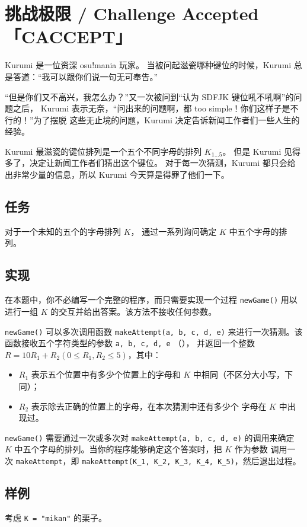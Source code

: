 \documentclass[UTF8, 11pt, a4paper]{article}
\begin{document}
\section*{挑战极限 / Challenge Accepted \makebox[2.5em]{} \small{「CACCEPT」}}

Kurumi 是一位资深 osu!mania 玩家。%
当被问起滋瓷哪种键位的时候，Kurumi 总是答道：“我可以跟你们说一句无可奉告。”%

“但是你们又不高兴，我怎么办？”又一次被问到“认为 SDFJK 键位吼不吼啊”的问题之后，%
Kurumi 表示无奈，“问出来的问题啊，都 too simple！你们这样子是不行的！”为了摆脱%
这些无止境的问题，Kurumi 决定告诉新闻工作者们一些人生的经验。

Kurumi 最滋瓷的键位排列是一个五个不同字母的排列 $K_{1 \dots 5}$。%
但是 Kurumi 见得多了，决定让新闻工作者们猜出这个键位。%
对于每一次猜测，Kurumi 都只会给出非常少量的信息，所以 Kurumi 今天算是得罪了他们一下。

\subsection*{任务}
对于一个未知的五个的字母排列 $K$，%
通过一系列询问确定 $K$ 中五个字母的排列。

\subsection*{实现}
在本题中，你不必编写一个完整的程序，而只需要实现一个过程 \texttt{newGame()}%
用以进行一组 $K$ 的交互并给出答案。该方法不接收任何参数。

\texttt{newGame()} 可以多次调用函数 \texttt{makeAttempt(a, b, c, d, e)}%
来进行一次猜测。该函数接收五个字符类型的参数 \texttt{a, b, c, d, e}%
（），%
并返回一个整数 $R = 10 R_1 + R_2 (0 \leq R_1, R_2 \leq 5)$，其中：
\begin{itemize}
    \item $R_1$ 表示五个位置中有多少个位置上的字母和 $K$ 中相同（不区分大小写，下同）；
    \item $R_2$ 表示除去正确的位置上的字母，在本次猜测中还有多少个%
        字母在 $K$ 中出现过。
\end{itemize}

\texttt{newGame()} 需要通过一次或多次对 \texttt{makeAttempt(a, b, c, d, e)}%
的调用来确定 $K$ 中五个字母的排列。当你的程序能够确定这个答案时，把 $K$ 作为参数%
调用一次 \texttt{makeAttempt}，即 \texttt{makeAttempt(K\_1, K\_2, K\_3, K\_4, K\_5)}，然后退出过程。

\subsection*{样例}
考虑 \texttt{K = "mikan"} 的栗子。
\end{document}
